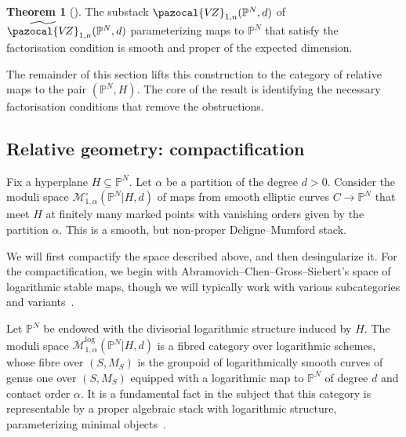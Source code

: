 \documentclass[11pt]{amsart}
\newcommand{\PP}{\mathbb P}
\newcommand{\VZ}{\pazocal{V\!Z}}
\renewcommand{\to}{\rightarrow}
\theoremstyle{definition}
\newtheorem{thm}{Theorem}[section]
\theoremstyle{definition}
\begin{document}
\begin{thm}[{\cite[Theorem B]{RSPW}}]
The substack $\VZ_{1,n}(\mathbb P^N,d)$ of $\widetilde\VZ_{1,n}(\PP^N,d)$ parameterizing maps to $\mathbb P^N$ that satisfy the factorisation condition is smooth and proper of the expected dimension.
\end{thm}

The remainder of this section lifts this construction to the category of relative maps to the pair $(\mathbb P^N,H)$. The core of the result is identifying the necessary factorisation conditions that remove the obstructions. 

\subsection{Relative geometry: compactification} Fix a hyperplane $H\subseteq \mathbb P^N$. Let $\alpha$ be a partition of the degree $d>0$. Consider the moduli space $\mathcal M_{1,\alpha}^\circ(\mathbb P^N|H,d)$ of maps from smooth elliptic curves $C\to \mathbb P^N$ that meet $H$ at finitely many marked points with vanishing orders given by the partition $\alpha$. This is a smooth, but non-proper Deligne--Mumford stack. 

We will first compactify the space described above, and then desingularize it. For the compactification, we begin with Abramovich--Chen--Gross--Siebert's space of logarithmic stable maps, though we will typically work with various subcategories and variants~\cite{AbramovichChenLog,ChenLog,GrossSiebertLog,KimLog}.

Let $\PP^N$ be endowed with the divisorial logarithmic structure induced by $H$. The moduli space $\overline{\mathcal{M}}^{\operatorname{log}}_{1,\alpha}(\mathbb P^N|H,d)$ is a fibred category over logarithmic schemes, whose fibre over $(S,M_S)$ is the groupoid of logarithmically smooth curves of genus one over $(S,M_S)$ equipped with a logarithmic map to $\mathbb P^N$ of degree $d$ and contact order $\alpha$. It is a fundamental fact in the subject that this category is representable by a proper algebraic stack with logarithmic structure, parameterizing minimal objects~\cite{ChenLog}. 

\end{document}
